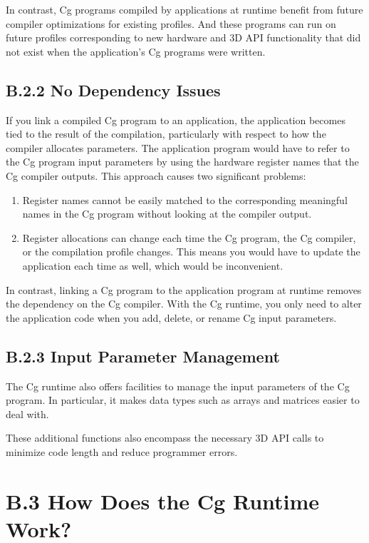 \documentclass[../main.tex]{subfiles}
\begin{document}
In contrast, Cg programs compiled by applications at runtime benefit from future compiler optimizations for existing profiles. And these programs can run on future profiles corresponding to new hardware and 3D API functionality that did not exist when the application's Cg programs were written.

\subsection{B.2.2 No Dependency Issues}

If you link a compiled Cg program to an application, the application becomes tied to the result of the compilation, particularly with respect to how the compiler allocates parameters. The application program would have to refer to the Cg program input parameters by using the hardware register names that the Cg compiler outputs. This approach causes two significant problems:

\begin{enumerate}
\item Register names cannot be easily matched to the corresponding meaningful names in the Cg program without looking at the compiler output.
\item Register allocations can change each time the Cg program, the Cg compiler, or the compilation profile changes. This means you would have to update the application each time as well, which would be inconvenient.
\end{enumerate}

In contrast, linking a Cg program to the application program at runtime removes the dependency on the Cg compiler. With the Cg runtime, you only need to alter the application code when you add, delete, or rename Cg input parameters.

\subsection{B.2.3 Input Parameter Management}

The Cg runtime also offers facilities to manage the input parameters of the Cg program. In particular, it makes data types such as arrays and matrices easier to deal with.

These additional functions also encompass the necessary 3D API calls to minimize code length and reduce programmer errors.

\section{B.3 How Does the Cg Runtime Work?}
\end{document}
